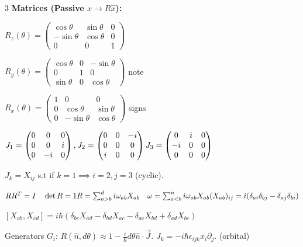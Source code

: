 \documentclass[10pt,a4paper]{article}
\begin{document}
\begin{multicols*}{3}
\textbf{ Matrices (Passive $x \to R \hat{x}$):}

$R_z(\theta) = \begin{pmatrix} \cos\theta & \sin\theta & 0 \\ -\sin\theta & \cos\theta & 0 \\ 0 & 0 & 1 \end{pmatrix}$

$ R_y(\theta) = \begin{pmatrix} \cos\theta & 0 & -\sin\theta \\ 0 & 1 & 0 \\ \sin\theta & 0 & \cos\theta \end{pmatrix}$ note

$R_x(\theta) = \begin{pmatrix} 1 & 0 & 0 \\ 0 & \cos\theta & \sin\theta \\ 0 & -\sin\theta & \cos\theta \end{pmatrix}$ signs

$J_1 = \begin{pmatrix} 0 & 0 & 0 \\ 0 & 0 & i \\ 0 & -i & 0 \end{pmatrix}, J_2 = \begin{pmatrix} 0 & 0 & -i \\ 0 & 0 & 0 \\ i & 0 & 0 \end{pmatrix}\\J_3 = \begin{pmatrix} 0 & i & 0 \\ -i & 0 & 0 \\ 0 & 0 & 0 \end{pmatrix}$


$J_k = X_{ij}$ s.t if $k=1 \implies i=2,j=3$ (cyclic).

$RR^T=I \quad \det R=1\\ R=\sum_{a>b}^di\omega_{ab}X_{ab} \quad \omega = \sum_{a < b}^n i \omega_{ab} X_{ab} \\ (X_{ab})_{ij} = i(\delta_{ai}\delta_{bj} - \delta_{aj}\delta_{bi})$

$[X_{ab}, X_{cd}] = i\hbar( \delta_{bc} X_{ad} - \delta_{bd} X_{ac} - \delta_{ac} X_{bd} + \delta_{ad} X_{bc})$

Generators $G_i$: $R(\hat{n}, d\theta) \approx 1 - \frac{i}{\hbar} d\theta \hat{n}\cdot\vec{J}$.
$J_k = -i\hbar \epsilon_{ijk} x_i \partial_j$. (orbital)


\end{multicols*}
\end{document}
